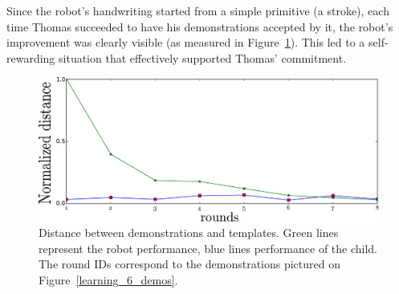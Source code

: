 \documentclass[10pt,a4paper]{article}
\begin{document}
Since the robot's handwriting started from a simple primitive (a stroke), each
time Thomas succeeded to have his demonstrations accepted by it, the robot's
improvement was clearly visible (as measured in Figure~\ref{Thomas_distances}).
This led to a self-rewarding situation that effectively supported Thomas'
commitment.

\begin{figure}[!]
    \centering
    \includegraphics[width=0.5\linewidth]{learning_6_distances}
    \caption{\small Distance between demonstrations and templates. Green lines represent the robot performance,
blue lines performance of the child. The round IDs correspond to the demonstrations
pictured on Figure~\ref{learning_6_demos}.}
    \label{Thomas_distances}
\end{figure}
\end{document}
